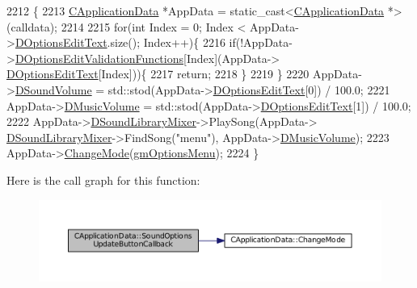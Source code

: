 \begin{DoxyCode}
2212                                                                      \{
2213     \hyperlink{classCApplicationData}{CApplicationData} *AppData = \textcolor{keyword}{static\_cast<}\hyperlink{classCApplicationData}{CApplicationData} *\textcolor{keyword}{>}(calldata);
2214     
2215     \textcolor{keywordflow}{for}(\textcolor{keywordtype}{int} Index = 0; Index < AppData->\hyperlink{classCApplicationData_a7044dc34cbd9d6776e8ef79eb12b5ce4}{DOptionsEditText}.size(); Index++)\{
2216         \textcolor{keywordflow}{if}(!AppData->\hyperlink{classCApplicationData_ab76fa444142de66fdb058f390e01112c}{DOptionsEditValidationFunctions}[Index](AppData->
      \hyperlink{classCApplicationData_a7044dc34cbd9d6776e8ef79eb12b5ce4}{DOptionsEditText}[Index]))\{
2217             \textcolor{keywordflow}{return};   
2218         \}
2219     \}
2220     AppData->\hyperlink{classCApplicationData_aa6e540f860dcb1929ef36ddce3be3691}{DSoundVolume} = std::stod(AppData->\hyperlink{classCApplicationData_a7044dc34cbd9d6776e8ef79eb12b5ce4}{DOptionsEditText}[0]) / 100.0;
2221     AppData->\hyperlink{classCApplicationData_a8bc61af4a83a667102e55cca2a739c3b}{DMusicVolume} = std::stod(AppData->\hyperlink{classCApplicationData_a7044dc34cbd9d6776e8ef79eb12b5ce4}{DOptionsEditText}[1]) / 100.0;
2222     AppData->\hyperlink{classCApplicationData_aa1e6876121bb4fb229ec6b930a8a6766}{DSoundLibraryMixer}->PlaySong(AppData->
      \hyperlink{classCApplicationData_aa1e6876121bb4fb229ec6b930a8a6766}{DSoundLibraryMixer}->FindSong(\textcolor{stringliteral}{"menu"}), AppData->\hyperlink{classCApplicationData_a8bc61af4a83a667102e55cca2a739c3b}{DMusicVolume});   
2223     AppData->\hyperlink{classCApplicationData_aee18c113e9a0acb3cad3d63eb19de71b}{ChangeMode}(\hyperlink{classCApplicationData_ac8ac37a4c8bb871036fbbdc6a072e403a81d2e5abad73eae4325b5ee0cc69fa3e}{gmOptionsMenu});
2224 \}
\end{DoxyCode}
Here is the call graph for this function\+:\nopagebreak
\begin{figure}[H]
\begin{center}
\leavevmode
\includegraphics[width=350pt]{classCApplicationData_ae63c8ca19ddeb92a3aaf0a5d67d09e58_cgraph}
\end{center}
\end{figure}
